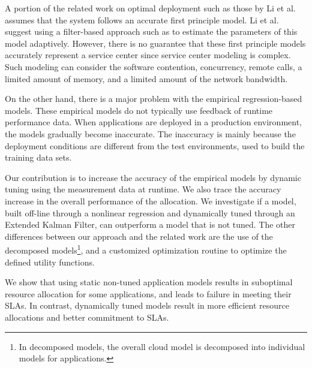 A portion of the related work on optimal deployment such as those by Li et al.\cite{li_fast_2009,li_performance_2009} assumes that the system follows an accurate first principle model. Li et al. suggest using a filter-based approach such as \cite{zheng-integrated-2011} to estimate the parameters of this model adaptively. 
However, there is no guarantee that these first principle models accurately represent a service center since service center modeling is complex. Such modeling can consider the software contention, concurrency, remote calls, a limited amount of memory, and a limited amount of the network bandwidth.  

On the other hand, there is a major problem with the empirical regression-based models. 
These empirical models do not typically use feedback of runtime performance data. 
When applications are deployed in a production environment, the models gradually become inaccurate. The inaccuracy is mainly because the deployment conditions are different from the test environments, used to build the training data sets.  
 
Our contribution is to increase the accuracy of the empirical models by dynamic tuning using the measurement data at runtime. We also trace the accuracy increase in the overall performance of the allocation. We investigate if a model, built off-line through a nonlinear regression and dynamically tuned through an Extended Kalman Filter, can outperform a model that is not tuned. The other differences between our approach and the related work are the use of the
decomposed models\footnote{In decomposed models, the overall cloud model is decomposed into individual models for applications.}, and a customized optimization routine to optimize the defined utility functions.   


We show that using static non-tuned application models results in suboptimal resource allocation for some applications, and leads to failure in meeting their SLAs. In contrast, dynamically tuned models result in more efficient resource allocations and better commitment to SLAs.%



